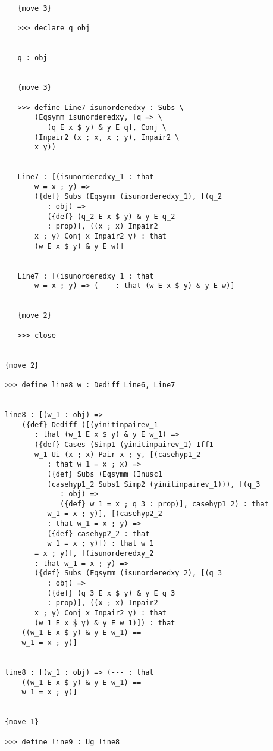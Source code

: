 \documentclass[12pt]{article}
\begin{document}
\begin{verbatim}
         {move 3}

         >>> declare q obj


         q : obj


         {move 3}

         >>> define Line7 isunorderedxy : Subs \
             (Eqsymm isunorderedxy, [q => \
                (q E x $ y) & y E q], Conj \
             (Inpair2 (x ; x, x ; y), Inpair2 \
             x y))


         Line7 : [(isunorderedxy_1 : that 
             w = x ; y) => 
             ({def} Subs (Eqsymm (isunorderedxy_1), [(q_2 
                : obj) => 
                ({def} (q_2 E x $ y) & y E q_2 
                : prop)], ((x ; x) Inpair2 
             x ; y) Conj x Inpair2 y) : that 
             (w E x $ y) & y E w)]


         Line7 : [(isunorderedxy_1 : that 
             w = x ; y) => (--- : that (w E x $ y) & y E w)]


         {move 2}

         >>> close


      {move 2}

      >>> define line8 w : Dediff Line6, Line7


      line8 : [(w_1 : obj) => 
          ({def} Dediff ([(yinitinpairev_1 
             : that (w_1 E x $ y) & y E w_1) => 
             ({def} Cases (Simp1 (yinitinpairev_1) Iff1 
             w_1 Ui (x ; x) Pair x ; y, [(casehyp1_2 
                : that w_1 = x ; x) => 
                ({def} Subs (Eqsymm (Inusc1 
                (casehyp1_2 Subs1 Simp2 (yinitinpairev_1))), [(q_3 
                   : obj) => 
                   ({def} w_1 = x ; q_3 : prop)], casehyp1_2) : that 
                w_1 = x ; y)], [(casehyp2_2 
                : that w_1 = x ; y) => 
                ({def} casehyp2_2 : that 
                w_1 = x ; y)]) : that w_1 
             = x ; y)], [(isunorderedxy_2 
             : that w_1 = x ; y) => 
             ({def} Subs (Eqsymm (isunorderedxy_2), [(q_3 
                : obj) => 
                ({def} (q_3 E x $ y) & y E q_3 
                : prop)], ((x ; x) Inpair2 
             x ; y) Conj x Inpair2 y) : that 
             (w_1 E x $ y) & y E w_1)]) : that 
          ((w_1 E x $ y) & y E w_1) == 
          w_1 = x ; y)]


      line8 : [(w_1 : obj) => (--- : that 
          ((w_1 E x $ y) & y E w_1) == 
          w_1 = x ; y)]


      {move 1}

      >>> define line9 : Ug line8



\end{verbatim}
\end{document}
